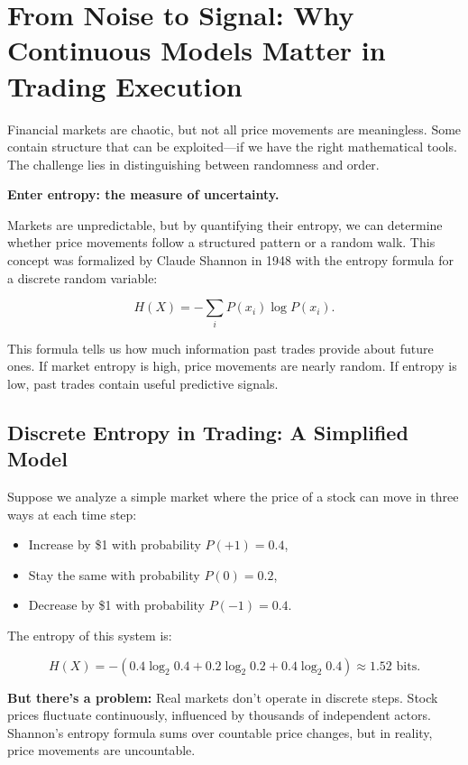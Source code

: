 \section{From Noise to Signal: Why Continuous Models Matter in Trading Execution}

Financial markets are chaotic, but not all price movements are meaningless. Some contain structure that can be exploited—if we have the right mathematical tools. The challenge lies in distinguishing between randomness and order.

\textbf{Enter entropy: the measure of uncertainty.}

Markets are unpredictable, but by quantifying their entropy, we can determine whether price movements follow a structured pattern or a random walk. This concept was formalized by Claude Shannon in 1948 with the entropy formula for a discrete random variable:

\[
H(X) = -\sum_{i} P(x_i) \log P(x_i).
\]

This formula tells us how much information past trades provide about future ones. If market entropy is high, price movements are nearly random. If entropy is low, past trades contain useful predictive signals.

\subsection{Discrete Entropy in Trading: A Simplified Model}

Suppose we analyze a simple market where the price of a stock can move in three ways at each time step:

\begin{itemize}
    \item Increase by \$1 with probability \( P(+1) = 0.4 \),
    \item Stay the same with probability \( P(0) = 0.2 \),
    \item Decrease by \$1 with probability \( P(-1) = 0.4 \).
\end{itemize}

The entropy of this system is:

\[
H(X) = - (0.4 \log_2 0.4 + 0.2 \log_2 0.2 + 0.4 \log_2 0.4) \approx 1.52 \text{ bits}.
\]

\textbf{But there’s a problem:} Real markets don’t operate in discrete steps. Stock prices fluctuate continuously, influenced by thousands of independent actors. Shannon’s entropy formula sums over countable price changes, but in reality, price movements are uncountable.

